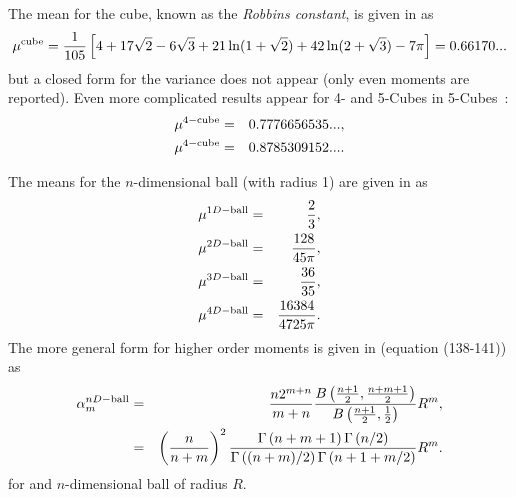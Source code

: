 The mean for the cube, known as the {\em Robbins constant}, is given
in \cite{robbins78:_constant,weisstein:_cube_line_picking} as
\begin{equation}
   \label{eq:cube_mean}
 \mu^{\rm cube} = \frac{1}{105} \left[ 
                             4 + 17 \sqrt{2}- 6 \sqrt{3}  +
                             21 \ln(1+\sqrt{2}) + 
                             42 \ln(2+\sqrt{3}) - 7 \pi
                      \right]
	=	0.66170...
\end{equation}
but a closed form for the variance does not appear (only even moments
are reported). Even more complicated results appear for 4- and 5-Cubes in
5-Cubes~\cite{philip:_probab_distr_distan_between_two_4d}:
\begin{eqnarray}
 \mu^{\rm 4-cube} & = & 0.7776656535 ...    \label{eq:4-cube}, \\
 \mu^{\rm 4-cube} & = & 0.8785309152 ...     \label{eq:5-cube}.
\end{eqnarray}

The means for the $n$-dimensional ball (with radius 1) are given in
\cite{weisstein:_ball_line_picking} as
\begin{eqnarray}
  \label{eq:ball-ndim-mean}
  \mu^{1D-{\rm ball}} & = & \frac{2}{3}, \\
  \mu^{2D-{\rm ball}} & = & \frac{128}{45 \pi},\\
  \mu^{3D-{\rm ball}} & = & \frac{36}{35}, \\
  \mu^{4D-{\rm ball}} & = & \frac{16384}{4725 \pi}.
\end{eqnarray}
The more general form for higher order moments is given in
\cite{tu00:_circle_line} (equation (138-141)) as
\begin{eqnarray}
  \label{eq:ball-ndim-moments}
  \alpha_m^{nD-{\rm ball}} & = &
     \frac{n 2^{m+n}}{m+n} \frac{B\left(\frac{n+1}{2}, \frac{n+m+1}{2}  \right)}{B\left(\frac{n+1}{2}, \frac{1}{2} \right)} R^m, \\
       & = & \left( \frac{n}{n+m} \right)^2 
                 \frac{\Gamma\left( n+m+1 \right) \Gamma\left( n/2 \right) }
                      {\Gamma\left( (n+m)/2 \right) \Gamma\left( n+1 + m/2 \right) } R^m.  
\end{eqnarray}
for and $n$-dimensional ball of radius $R$.







